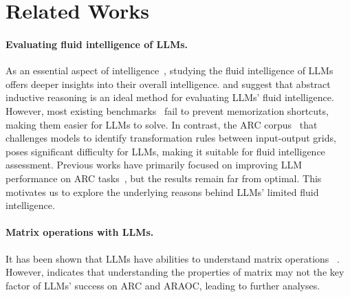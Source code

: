 \section{Related Works}

\paragraph{Evaluating fluid intelligence of LLMs.}
As an essential aspect of intelligence~\cite{cattell1963theory, cattell1971abilities, jaeggi2008improving}, studying the fluid intelligence of LLMs offers deeper insights into their overall intelligence. \citet{chollet2019measure} and \citet{barak2024investigating} suggest that abstract inductive reasoning is an ideal method for evaluating LLMs' fluid intelligence. However, most existing benchmarks~\cite{honovich2023instruction, yang2024language, qiuphenomenal} fail to prevent memorization shortcuts, making them easier for LLMs to solve. In contrast, the ARC corpus~\cite{chollet2019measure} that challenges models to identify transformation rules between input-output grids, poses significant difficulty for LLMs, making it suitable for fluid intelligence assessment. 
Previous works have primarily focused on improving LLM performance on ARC tasks~\cite{min2023approach, tan2023large, xullms, mirchandani2023large, wang2024speak, huang2024anpl, wang2023hypothesis}, but the results remain far from optimal. This motivates us to explore the underlying reasons behind LLMs' limited fluid intelligence.

\paragraph{Matrix operations with LLMs.}
It has been shown that LLMs have abilities to understand matrix operations%
~\cite{charton2021linear, collins2024evaluating, azerbayevllemma, shao2024deepseekmath}. However,  indicates that understanding the properties of matrix may not the key factor of LLMs' success on ARC and ARAOC, leading to further analyses.

